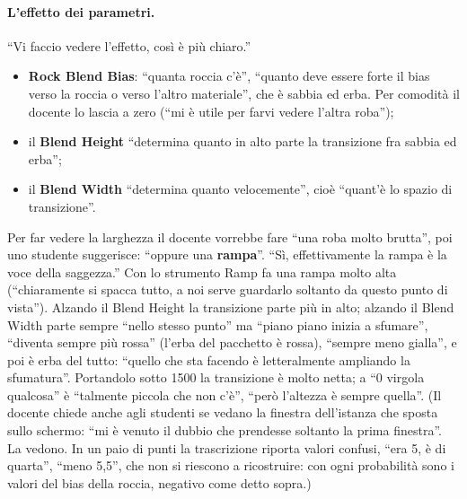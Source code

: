 \paragraph{L'effetto dei parametri.} ``Vi faccio vedere l'effetto, così è più chiaro.''
\begin{itemize}
  \item \textbf{Rock Blend Bias}: ``quanta roccia c'è'', ``quanto deve essere forte il bias
        verso la roccia o verso l'altro materiale'', che è sabbia ed erba. Per comodità il
        docente lo lascia a zero (``mi è utile per farvi vedere l'altra roba'');
  \item il \textbf{Blend Height} ``determina quanto in alto parte la transizione fra sabbia
        ed erba'';
  \item il \textbf{Blend Width} ``determina quanto velocemente'', cioè ``quant'è lo spazio di
        transizione''.
\end{itemize}
Per far vedere la larghezza il docente vorrebbe fare ``una roba molto brutta'', poi uno
studente suggerisce: ``oppure una \textbf{rampa}''. ``Sì, effettivamente la rampa è la voce
della saggezza.'' Con lo strumento Ramp fa una rampa molto alta (``chiaramente si spacca
tutto, a noi serve guardarlo soltanto da questo punto di vista''). Alzando il Blend Height
la transizione parte più in alto; alzando il Blend Width parte sempre ``nello stesso punto''
ma ``piano piano inizia a sfumare'', ``diventa sempre più rossa'' (l'erba del pacchetto è
rossa), ``sempre meno gialla'', e poi è erba del tutto: ``quello che sta facendo è
letteralmente ampliando la sfumatura''. Portandolo sotto 1500 la transizione è molto netta;
a ``0 virgola qualcosa'' è ``talmente piccola che non c'è'', ``però l'altezza è sempre
quella''. (Il docente chiede anche agli studenti se vedano la finestra dell'istanza che
sposta sullo schermo: ``mi è venuto il dubbio che prendesse soltanto la prima finestra''. La
vedono. In un paio di punti la trascrizione riporta valori confusi, ``era 5, è di quarta'',
``meno 5,5'', che non si riescono a ricostruire: con ogni probabilità sono i valori del bias
della roccia, negativo come detto sopra.)

